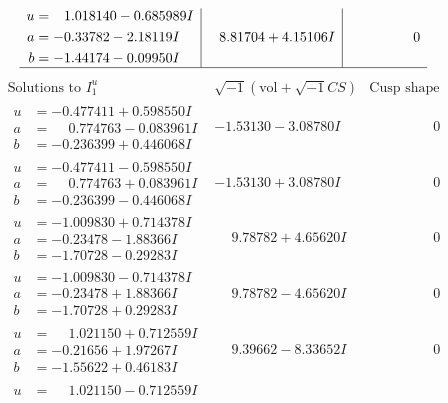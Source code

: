 \documentclass[1p]{elsarticle_modified}
\theoremstyle{definition}
\newcommand{\I}{\sqrt{-1}}
\begin{document}
$$\begin{array}{c|c|c}
\begin{aligned}
u &= \phantom{-}1.018140 - 0.685989 I \\
a &= -0.33782 - 2.18119 I \\
b &= -1.44174 - 0.09950 I\end{aligned}
 & \phantom{-}8.81704 + 4.15106 I & \phantom{-0.000000 } 0\\
 \hline 
 \end{array}$$\newpage$$\begin{array}{c|c|c}  
\text{Solutions to }I^u_{1}& \I (\text{vol} + \sqrt{-1}CS) & \text{Cusp shape}\\
 \hline 
\begin{aligned}
u &= -0.477411 + 0.598550 I \\
a &= \phantom{-}0.774763 - 0.083961 I \\
b &= -0.236399 + 0.446068 I\end{aligned}
 & -1.53130 - 3.08780 I & \phantom{-0.000000 } 0 \\ \hline\begin{aligned}
u &= -0.477411 - 0.598550 I \\
a &= \phantom{-}0.774763 + 0.083961 I \\
b &= -0.236399 - 0.446068 I\end{aligned}
 & -1.53130 + 3.08780 I & \phantom{-0.000000 } 0 \\ \hline\begin{aligned}
u &= -1.009830 + 0.714378 I \\
a &= -0.23478 - 1.88366 I \\
b &= -1.70728 - 0.29283 I\end{aligned}
 & \phantom{-}9.78782 + 4.65620 I & \phantom{-0.000000 } 0 \\ \hline\begin{aligned}
u &= -1.009830 - 0.714378 I \\
a &= -0.23478 + 1.88366 I \\
b &= -1.70728 + 0.29283 I\end{aligned}
 & \phantom{-}9.78782 - 4.65620 I & \phantom{-0.000000 } 0 \\ \hline\begin{aligned}
u &= \phantom{-}1.021150 + 0.712559 I \\
a &= -0.21656 + 1.97267 I \\
b &= -1.55622 + 0.46183 I\end{aligned}
 & \phantom{-}9.39662 - 8.33652 I & \phantom{-0.000000 } 0 \\ \hline\begin{aligned}
u &= \phantom{-}1.021150 - 0.712559 I \\

\end{aligned}
\end{array}$$
\end{document}
